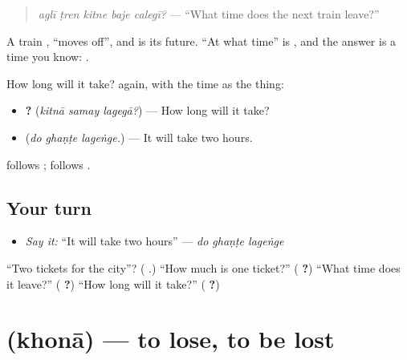\begin{quote}
\emph{aglī ṭren kitne baje calegī?} — \textquotedblleft{}What time does the next train leave?\textquotedblright{}
\end{quote}

A train \textbf{ }, \textquotedblleft{}moves off\textquotedblright{}, and \textbf{} is its future. \textquotedblleft{}At what time\textquotedblright{} is \textbf{ }, and the answer is a time you know: \textbf{ }.

How long will it take? \textbf{} again, with the time as the thing:

\begin{itemize}
\raggedright
  \item \textbf{  ?} (\emph{kitnā samay lagegā?}) — How long will it take?
  \item \textbf{  } (\emph{do ghaṇṭe lageṅge.}) — It will take two hours.
\end{itemize}

\textbf{} follows \textbf{}; \textbf{} follows \textbf{ }.

\subsection*{Your turn}
\begin{itemize}
\raggedright
  \item \emph{Say it:} \textquotedblleft{}It will take two hours\textquotedblright{} — \emph{do ghaṇṭe lageṅge}
\end{itemize}

\begin{tcolorbox}[breakable,colback=teal!4,colframe=teal!35!black,title={Before you move on}]
\textquotedblleft{}Two tickets for the city\textquotedblright{}? (\textbf{     }.) \textquotedblleft{}How much is one ticket?\textquotedblright{} (\textbf{    ?}) \textquotedblleft{}What time does it leave?\textquotedblright{} (\textbf{  ?}) \textquotedblleft{}How long will it take?\textquotedblright{} (\textbf{  ?})
\end{tcolorbox}
\section[\texorpdfstring{\hi{खोना} (khonā)}{खोना (khonā)}]{ (khonā) — to lose, to be lost}

